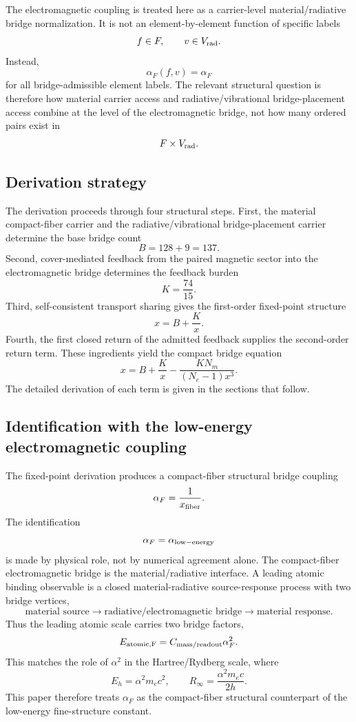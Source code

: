 The electromagnetic coupling is treated here as a carrier-level
material/radiative bridge normalization. It is not an element-by-element
function of specific labels
\[
f\in F,
\qquad
v\in V_{\rm rad}.
\]
Instead,
\[
\alpha_F(f,v)=\alpha_F
\]
for all bridge-admissible element labels. The relevant structural
question is therefore how material carrier access and
radiative/vibrational bridge-placement access combine at the level of
the electromagnetic bridge, not how many ordered pairs exist in
\[
F\times V_{\rm rad}.
\]

\subsection{Derivation strategy}

The derivation proceeds through four structural steps. First, the
material compact-fiber carrier and the radiative/vibrational
bridge-placement carrier determine the base bridge count
\[
B=128+9=137.
\]
Second, cover-mediated feedback from the paired magnetic sector into the
electromagnetic bridge determines the feedback burden
\[
K=\frac{74}{15}.
\]
Third, self-consistent transport sharing gives the first-order
fixed-point structure
\[
x=B+\frac{K}{x}.
\]
Fourth, the first closed return of the admitted feedback supplies the
second-order return term. These ingredients yield the compact bridge
equation
\[
x
=
B+\frac{K}{x}
-
\frac{K N_m}{(N_e-1)x^3}.
\]
The detailed derivation of each term is given in the sections that
follow.

\subsection{Identification with the low-energy electromagnetic coupling}

The fixed-point derivation produces a compact-fiber structural bridge
coupling
\[
\alpha_F=\frac{1}{x_{\rm fiber}}.
\]
The identification
\[
\alpha_F=\alpha_{\rm low-energy}
\]
is made by physical role, not by numerical agreement alone. The
compact-fiber electromagnetic bridge is the material/radiative interface.
A leading atomic binding observable is a closed material-radiative
source-response process with two bridge vertices,
\[
\text{material source}
\rightarrow
\text{radiative/electromagnetic bridge}
\rightarrow
\text{material response}.
\]
Thus the leading atomic scale carries two bridge factors,
\[
E_{\rm atomic,F}
=
C_{\rm mass/readout}\alpha_F^2.
\]
This matches the role of \(\alpha^2\) in the Hartree/Rydberg scale,
where
\[
E_h=\alpha^2m_ec^2,
\qquad
R_\infty=\frac{\alpha^2m_ec}{2h}.
\]
This paper therefore treats \(\alpha_F\) as the compact-fiber structural
counterpart of the low-energy fine-structure constant.

